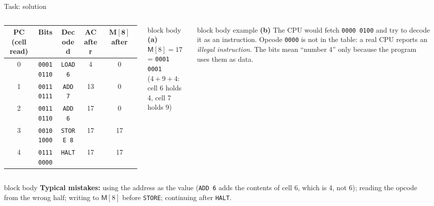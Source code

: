 \documentclass[aspectratio=169,10pt]{beamer}
\begin{document}
\begin{frame}{Task: solution}
  \begin{columns}[T,onlytextwidth]
      \centering
      \scriptsize
      \renewcommand{\arraystretch}{1.35}
      \begin{tabular}{ccccc}
        \toprule
        \textbf{PC (cell read)} & \textbf{Bits} & \textbf{Decoded} & \textbf{AC after} & $\mathbf{M[8]}$ \textbf{after} \\
        \midrule
        0 & \mbox{\texttt{0001 0110}} & \texttt{LOAD 6}  & 4  & 0 \\
        1 & \mbox{\texttt{0011 0111}} & \texttt{ADD 7}   & 13 & 0 \\
        2 & \mbox{\texttt{0011 0110}} & \texttt{ADD 6}   & 17 & 0 \\
        3 & \mbox{\texttt{0010 1000}} & \texttt{STORE 8} & 17 & 17 \\
        4 & \mbox{\texttt{0111 0000}} & \texttt{HALT}    & 17 & 17 \\
        \bottomrule
      \end{tabular}
      \footnotesize
      \begin{beamercolorbox}[rounded=true,sep=0.1cm,wd=\linewidth]{block body}
        \textbf{(a)} $\mathsf{M}[8] = 17$ = \mbox{\texttt{0001 0001}}\\
        \scriptsize ($4 + 9 + 4$: cell 6 holds 4, cell 7 holds 9)
      \end{beamercolorbox}
      \vspace{0.08cm}
      \begin{beamercolorbox}[rounded=true,sep=0.1cm,wd=\linewidth]{block body example}
        \textbf{(b)} The CPU would fetch \mbox{\texttt{0000 0100}} and try to decode it as an instruction.
        Opcode \texttt{0000} is not in the table: a real CPU reports an \emph{illegal instruction}.
        The bits mean ``number 4'' only because the program uses them as data.
      \end{beamercolorbox}
  \end{columns}
  \vspace{0.15cm}
  \begin{beamercolorbox}[rounded=true,sep=0.1cm,wd=\textwidth]{block body}
    \centering\scriptsize
    \textbf{Typical mistakes:} using the address as the value (\texttt{ADD 6} adds the contents of cell 6, which is 4, not 6);
    reading the opcode from the wrong half; writing to $\mathsf{M}[8]$ before \texttt{STORE};
    continuing after \texttt{HALT}.
  \end{beamercolorbox}
\end{frame}
\end{document}
